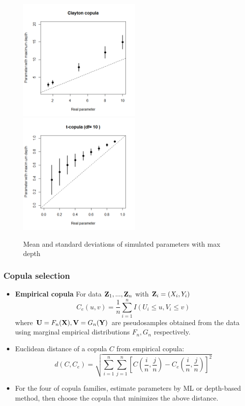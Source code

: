 \documentclass[handout,10pt]{beamer}
\begin{document}
\begin{frame}
\begin{figure}[t]
	\centering
		\includegraphics[height=6cm]{CopDepth_Clay.png}
		\includegraphics[height=6cm]{CopDepth_t10.png}
	\label{fig:fig1}
	\caption{Mean and standard deviations of simulated parameters with max depth}
\end{figure}
\end{frame}

\begin{frame}
\frametitle{Copula selection}
\begin{itemize}
\item \textbf{Empirical copula} For data ${\mathbf{Z}}_1,...,{\mathbf{Z}}_n$ with ${\mathbf{Z}}_i=(X_i,Y_i)$
$$ C_e(u,v) = \frac{1}{n}\sum_{i=1}^n I(U_i\leq u, V_i\leq v)$$
where ${\mathbf{U}} = F_n({\mathbf{X}}), {\mathbf{V}} = G_n({\mathbf{Y}})$ are pseudosamples obtained from the data using marginal empirical distributions $F_n, G_n$ respectively.
\vspace{.2cm}
\item Euclidean distance of a copula $C$ from empirical copula:
$$ d(C,C_e) = \sqrt{\sum_{i=1}^n\sum_{j=1}^n \left[C\left(\frac{i}{n},\frac{j}{n}\right) - C_e\left(\frac{i}{n},\frac{j}{n}\right)\right]^2} $$
\item For the four of copula families, estimate parameters by ML or depth-based method, then choose the copula that minimizes the above distance.
\end{itemize}
\end{frame}
\end{document}
